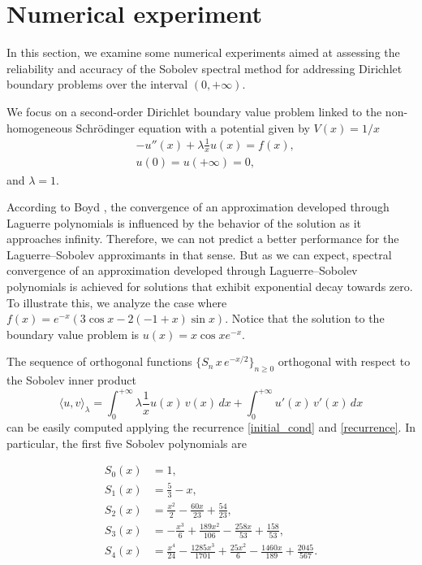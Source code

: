 \documentclass[reqno,10pt]{amsart}
\theoremstyle{plain}
\numberwithin{equation}{section}
\numberwithin{figure}{section}
\begin{document}
\section{
Numerical experiment
}

In this section, we examine some numerical experiments aimed at assessing the reliability and accuracy of the Sobolev spectral method for addressing Dirichlet boundary problems over the interval \((0,+\infty)\).

We focus on a second-order Dirichlet boundary value problem linked to the non-homogeneous Schrödinger equation with a potential given by \(V(x) = 1/x\)
\begin{align*}
&- u''(x) + \lambda \frac{1}{x} u(x) = f(x), \\
& u(0) = u(+\infty) = 0,
\end{align*}
and $\lambda = 1$.

According to Boyd \cite{Boyd01}, the convergence of an approximation developed through Laguerre polynomials is influenced by the behavior of the solution as it approaches infinity. Therefore, we can not predict a better performance for the Laguerre--Sobolev approximants in that sense. But as we can expect, spectral convergence of an approximation developed through Laguerre--Sobolev polynomials is achieved for solutions that exhibit exponential decay towards zero. To illustrate this, we analyze the case where $f(x)= e^{-x} (3 \cos{x} - 2 (-1 + x) \sin{x})$. Notice that the solution to the boundary value problem is $u(x) = x \cos{x} e^{-x}$.


The sequence of orthogonal functions $\{ S_{n}\, x\,e^{-x/2}\}_{n\geqslant0}$ orthogonal with respect to the Sobolev inner product
$$
\langle u, v\rangle_\lambda = \int_{0}^{+\infty}\lambda \frac{1}{x} u(x)\,v(x)\,dx + \int_{0}^{+\infty} u'(x)\,v'(x)\,dx
$$
can be easily computed applying the recurrence \eqref{initial_cond} and \eqref{recurrence}. In particular, the first five Sobolev polynomials are

\begin{align*}
S_0(x) &= 1,\\
S_1(x) &= \frac{5}{3}-x,\\
S_2(x) &= \frac{x^2}{2}-\frac{60 x}{23}+\frac{54}{23},\\
S_3(x) &= -\frac{x^3}{6}+\frac{189 x^2}{106}-\frac{258
   x}{53}+\frac{158}{53},\\
S_4(x) &= \frac{x^4}{24}-\frac{1285 x^3}{1701}+\frac{25 x^2}{6}-\frac{1460 x}{189}+\frac{2045}{567}.
\end{align*}
\end{document}
